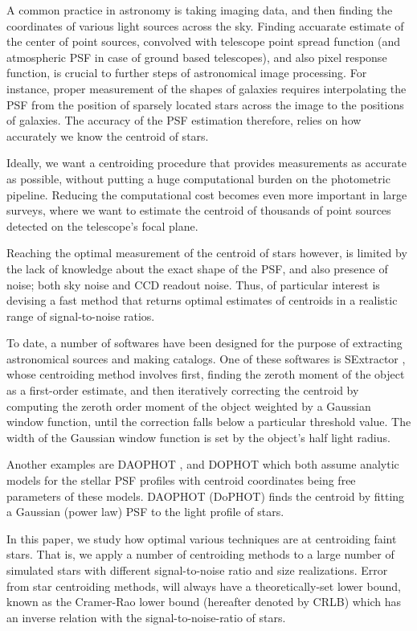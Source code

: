 \documentclass[12pt, preprint]{aastex}
\begin{document}
A common practice in astronomy is taking imaging data, and then finding the coordinates
of various light sources across the sky. Finding accuarate estimate of the center of point
sources, convolved with telescope point spread function (and atmospheric PSF in case of
ground based telescopes), and also pixel response function, is crucial to further steps of
astronomical image processing. For instance, proper measurement of the shapes of galaxies
requires interpolating the PSF from the position of sparsely located stars across the
image to the positions of galaxies. The accuracy of the PSF estimation therefore,
relies on how accurately we know the centroid of stars. 

Ideally, we want a centroiding procedure that provides measurements as accurate as possible,
without putting a huge computational burden on the photometric pipeline.
Reducing the computational cost becomes even more important in large surveys,
where we want to estimate the centroid of thousands of point sources detected
on the telescope's focal plane. 

Reaching the optimal measurement of the centroid of stars however, is limited
by the lack of knowledge about the exact shape of the PSF, and also presence of noise;
both sky noise and CCD readout noise. Thus, of particular interest is devising a fast method that returns
optimal estimates of centroids in a realistic range of signal-to-noise ratios.

To date, a number of softwares have been designed for the purpose of extracting astronomical
sources and making catalogs. One of these softwares is SExtractor \citep{sex},
whose centroiding method involves first, finding the zeroth moment of the object
as a first-order estimate, and then iteratively correcting the centroid by computing
the zeroth order moment of the object weighted by a Gaussian window function,
until the correction falls below a particular threshold value.
The width of the Gaussian window function is set by the object's half light radius.

Another examples are DAOPHOT \citep{daophot}, and DOPHOT \citep{dophot}
which both assume analytic models for the stellar PSF profiles with centroid
coordinates being free parameters of these models.
DAOPHOT (DoPHOT) finds the centroid by fitting a Gaussian (power law) PSF to
the light profile of stars.

In this paper, we study how optimal various techniques are at centroiding 
faint stars. That is, we apply a number of centroiding methods 
to a large number of simulated stars with different signal-to-noise ratio and
 size realizations. Error from star centroiding methods, will always have 
a theoretically-set lower bound, known as the Cramer-Rao lower bound
(hereafter denoted by CRLB) which has an inverse relation with the
signal-to-noise-ratio of stars.
\end{document}
